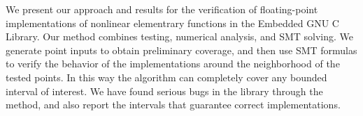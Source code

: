 
We present our approach and results for the verification of floating-point implementations of nonlinear elementrary functions in the Embedded GNU C Library. Our method combines testing, numerical analysis, and SMT solving. We generate point inputs to obtain preliminary coverage, and then use SMT formulas to verify the behavior of the implementations around the neighborhood of the tested points. In this way the algorithm can completely cover any bounded interval of interest. We have found serious bugs in the library through the method, and also report the intervals that guarantee correct implementations.  



